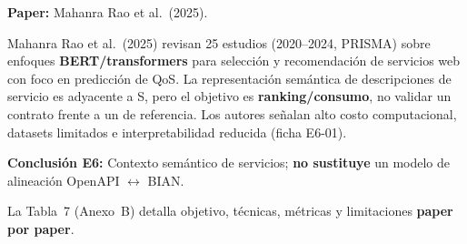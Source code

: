 \textbf{Paper:} Mahanra Rao et al.\ (2025).

Mahanra Rao et al.\ (2025) revisan 25 estudios (2020--2024, PRISMA) sobre enfoques
\textbf{BERT/transformers} para selección y recomendación de servicios web con foco en predicción de
QoS. La representación semántica de descripciones de servicio es adyacente a S, pero el objetivo es
\textbf{ranking/consumo}, no validar un contrato frente a un \ServiceDomain{} de referencia. Los
autores señalan alto costo computacional, datasets limitados e interpretabilidad reducida (ficha
E6-01).

\textbf{Conclusión E6:} Contexto semántico de servicios; \textbf{no sustituye} un modelo de
alineación OpenAPI $\leftrightarrow$ BIAN.



La Tabla~7 (Anexo~B) detalla objetivo, técnicas, métricas y limitaciones \textbf{paper por paper}.
